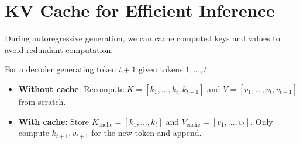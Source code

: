 \section{KV Cache for Efficient Inference}

During autoregressive generation, we can cache computed keys and values to avoid redundant computation.

\begin{definition}[KV Cache]
    For a decoder generating token $t+1$ given tokens $1, \ldots, t$:
    \begin{itemize}
        \item \textbf{Without cache}: Recompute $K = [k_1, \ldots, k_t, k_{t+1}]$ and $V = [v_1, \ldots, v_t, v_{t+1}]$ from scratch.
        \item \textbf{With cache}: Store $K_{\text{cache}} = [k_1, \ldots, k_t]$ and $V_{\text{cache}} = [v_1, \ldots, v_t]$. Only compute $k_{t+1}, v_{t+1}$ for the new token and append.
    \end{itemize}
\end{definition}


